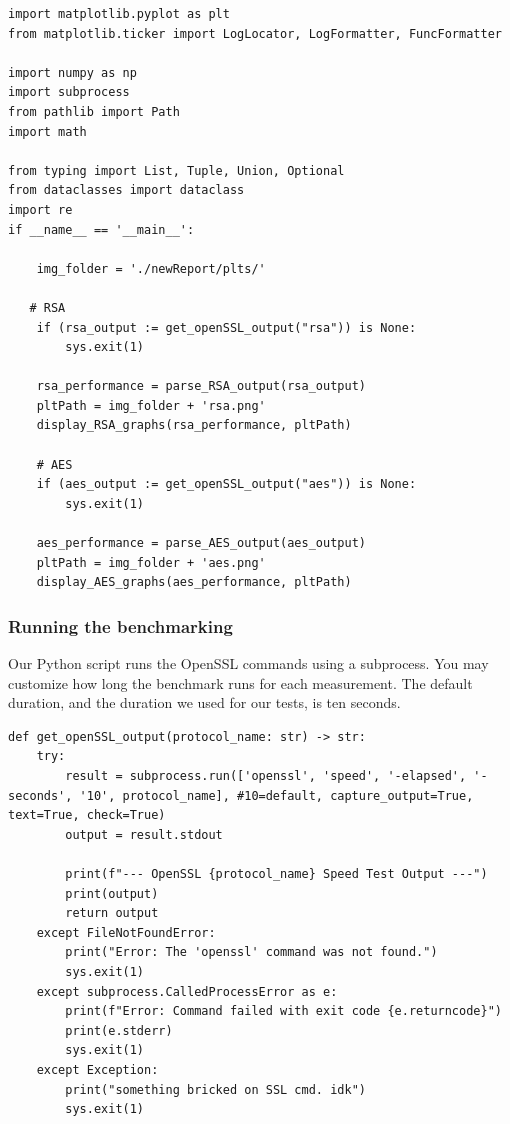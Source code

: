 \documentclass[11pt]{article}
\begin{document}
\begin{lstlisting}
import matplotlib.pyplot as plt
from matplotlib.ticker import LogLocator, LogFormatter, FuncFormatter

import numpy as np
import subprocess
from pathlib import Path
import math

from typing import List, Tuple, Union, Optional
from dataclasses import dataclass
import re
if __name__ == '__main__':
    
    img_folder = './newReport/plts/'

   # RSA
    if (rsa_output := get_openSSL_output("rsa")) is None:
        sys.exit(1)

    rsa_performance = parse_RSA_output(rsa_output)
    pltPath = img_folder + 'rsa.png'
    display_RSA_graphs(rsa_performance, pltPath)

    # AES
    if (aes_output := get_openSSL_output("aes")) is None:
        sys.exit(1)

    aes_performance = parse_AES_output(aes_output)
    pltPath = img_folder + 'aes.png'
    display_AES_graphs(aes_performance, pltPath) 
\end{lstlisting}

\subsubsection*{Running the benchmarking}

Our Python script runs the OpenSSL commands using a subprocess. You may customize how long the benchmark runs for each measurement. The default duration, and the duration we used for our tests, is ten seconds.

\begin{lstlisting}
def get_openSSL_output(protocol_name: str) -> str:
    try:
        result = subprocess.run(['openssl', 'speed', '-elapsed', '-seconds', '10', protocol_name], #10=default, capture_output=True, text=True, check=True)
        output = result.stdout
        
        print(f"--- OpenSSL {protocol_name} Speed Test Output ---")
        print(output)
        return output
    except FileNotFoundError:
        print("Error: The 'openssl' command was not found.")
        sys.exit(1)
    except subprocess.CalledProcessError as e:
        print(f"Error: Command failed with exit code {e.returncode}")
        print(e.stderr)
        sys.exit(1)
    except Exception:
        print("something bricked on SSL cmd. idk")
        sys.exit(1)
\end{lstlisting}
\end{document}
